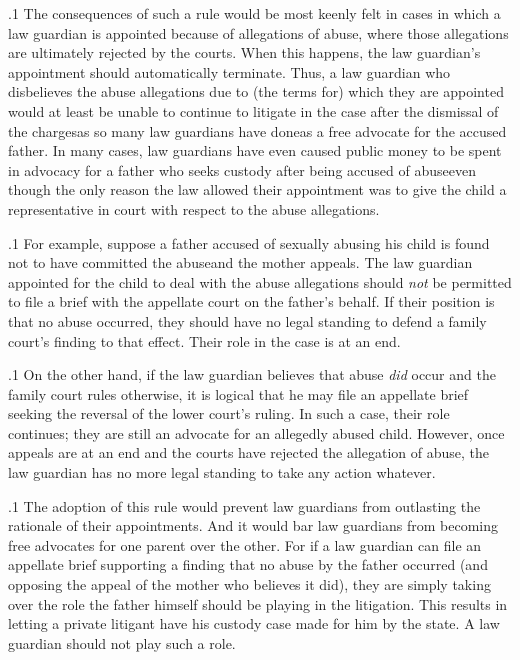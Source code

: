 \documentclass[11pt, twoside]{article}
\begin{document}
{\p.1{%
The consequences of such a rule would be most keenly felt in cases in
which a law guardian is appointed because of allegations of abuse, where
those allegations are ultimately rejected by the courts. When this happens, the law guardian’s appointment should automatically terminate.
Thus, a law guardian who disbelieves the abuse allegations due to (the
terms for) which they are appointed would at least be unable to continue
to litigate in the case after the dismissal of the charges\mdash{}as so many law
guardians have done\mdash{}as a free advocate for the accused father. In many
cases, law guardians have even caused public money to be spent in advocacy for a father who seeks custody after being accused of abuse\mdash{}even
though the only reason the law allowed their appointment was to give
the child a representative in court with respect to the abuse allegations.
}%

\p.1{%
For example, suppose a father accused of sexually abusing his child is
found not to have committed the abuse\mdash{}and the mother appeals. The
law guardian appointed for the child to deal with the abuse allegations
should \textit{not} be permitted to file a brief with the appellate court on the
father’s behalf. If their position is that no abuse occurred, they should have
no legal standing to defend a family court’s finding to that
effect. Their role in the case is at an end.
}%

\p.1{%
On the other hand, if the law guardian believes that abuse \textit{did} occur
and the family court rules otherwise, it is logical that he may file an appellate brief seeking the reversal of the lower court’s ruling. In such a
case, their role continues; they are still an advocate for an allegedly abused child. However, once appeals are at an end and the courts
have rejected the allegation of abuse, the law guardian has no more legal
standing to take any action whatever.
}%

\p.1{%
The adoption of this rule would prevent law guardians from outlasting the rationale of their appointments. And it would bar law guardians
from becoming free advocates for one parent over the other. For if a law
guardian can file an appellate brief supporting a finding that no abuse by
the father occurred (and opposing the appeal of the mother who believes
it did), they are simply taking over the role the father himself
should be playing in the litigation. This results in letting a private litigant have his custody case made for him by the state. A law guardian
should not play such a role.
}%


}
\end{document}
